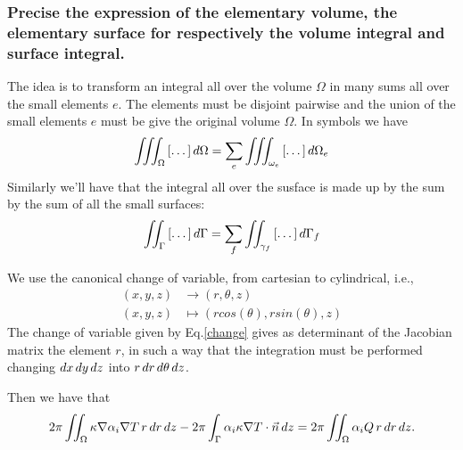 \subsubsection{Precise the expression of the elementary volume, the elementary surface for respectively the volume integral and surface integral.}
\begin{mdframed}
	The idea is to transform an integral all over the volume $ \Omega $ in many sums all over the small elements $ e $. The elements must be disjoint pairwise and the union of the small elements $ e $ must be give the original volume $ \Omega $. In symbols we have
	\[\iiint_{\Omega}\left[\dots\right]\mathop{}\!d\Omega=\sum_e\iiint_{\omega_e}\left[\dots\right]\mathop{}\!d\Omega_e \]
	Similarly we'll have that the integral all over the susface is made up by the sum by the sum of all the small surfaces:
	\[\iint_{\Gamma}\left[\dots\right]\mathop{}\!d\Gamma=\sum_f\iint_{\gamma_f}\left[\dots\right]\mathop{}\!d\Gamma_f \] 
	
	We use the canonical change of variable, from cartesian to cylindrical, i.e., \begin{align}\label{change}
	(x,y,z)&\to(r,\theta,z)\\
	(x,y,z)&\mapsto(rcos(\theta),rsin(\theta),z)\nonumber
	\end{align}
	The change of variable given by Eq.\ref{change} gives as determinant of the Jacobian matrix the element $ r $, in such a way that the integration must be performed changing $ \mathop{}\!d x\mathop{}\!d y\mathop{}\!d z $ into $ r\mathop{}\!d r\mathop{}\!d\theta\mathop{}\!d z $.
	
	Then we have that 
	\[ 2\pi\iint_{\Omega}\kappa\nabla\alpha_i\nabla T\,r\mathop{}\!d r\mathop{}\!d z-2\pi\int_{\Gamma}\alpha_i\kappa\nabla T\cdot\vec{n}\mathop{}\!d z=2\pi\iint_{\Omega}\alpha_i Q\,r\mathop{}\!d r\mathop{}\!d z. \]
	

\end{mdframed}
